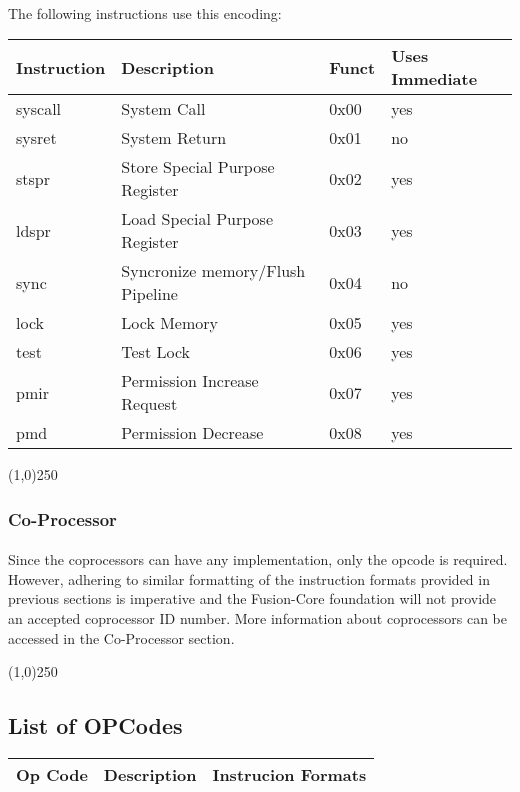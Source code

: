 \documentclass[letterpaper, 11pt]{article}
\begin{document}
\paragraph{}The following instructions use this encoding: \\
\begin{center}
	\begin{tabular}{|l|l|l|l|} \hline
			Instruction & Description 						& Funct & Uses Immediate\\ \hline
			syscall		& System Call						& 0x00  & yes \\ \hline
			sysret		& System Return						& 0x01  & no  \\ \hline
			stspr		& Store Special Purpose Register	& 0x02  & yes \\ \hline
			ldspr		& Load Special Purpose Register		& 0x03  & yes \\ \hline
			sync		& Syncronize memory/Flush Pipeline  & 0x04  & no  \\ \hline
			lock		& Lock Memory						& 0x05  & yes \\ \hline
			test		& Test Lock 						& 0x06  & yes \\ \hline
			pmir		& Permission Increase Request		& 0x07  & yes \\ \hline
			pmd			& Permission Decrease				& 0x08  & yes \\ \hline


\end{tabular}
\end{center}
\begin{center}
	\line(1,0){250}
\end{center}
\subsubsection{Co-Processor}

\paragraph{}Since the coprocessors can have any implementation, only the opcode is required. However, adhering to similar formatting of the instruction formats provided in previous sections is imperative and the Fusion-Core foundation will not provide an accepted coprocessor ID number. More information about coprocessors can be accessed in the Co-Processor section.
\begin{center}
	\line(1,0){250}
\end{center}
\subsection{List of OPCodes}
	\begin{center}
		\begin{tabular}{|c|c|c|}
			Op Code & Description & Instrucion Formats \\ \hline
		\end{tabular}
	\end{center}
\end{document}
